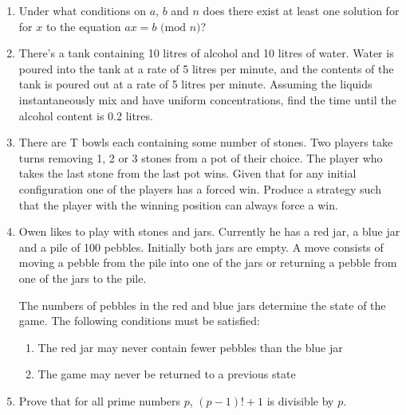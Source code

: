 \documentclass{article}
\begin{document}
\begin{enumerate}
    \item
    Under what conditions on $a$, $b$ and $n$ does there exist at least one solution for for $x$ to the equation $ax = b \text{ (mod } n\text{)}$?
    
    \item
    There's a tank containing 10 litres of alcohol and 10 litres of water. Water is poured into the tank at a rate of 5 litres per minute, and the contents of the tank is poured out at a rate of 5 litres per minute. Assuming the liquids instantaneously mix and have uniform concentrations, find the time until the alcohol content is 0.2 litres.
    
    \item
    There are T bowls each containing some number of stones. Two players take turns removing 1, 2 or 3 stones from a pot of their choice. The player who takes the last stone from the last pot wins. Given that for any initial configuration one of the players has a forced win. Produce a strategy such that the player with the winning position can always force a win.
    
    \item
    Owen likes to play with stones and jars. Currently he has a red jar, a blue jar and a pile of 100 pebbles. Initially both jars are empty. A move consists of moving a pebble from the pile into one of the jars or returning a pebble from one of the jars to the pile.
    
    The numbers of pebbles in the red and blue jars determine the state of the game. The following conditions must be satisfied:
    
    \begin{enumerate}
        \item The red jar may never contain fewer pebbles than the blue jar
        \item The game may never be returned to a previous state
    \end{enumerate}
    
    \item
    Prove that for all prime numbers $p$, $(p-1)! + 1$ is divisible by $p$.
    
    
    
    
    
    
\end{enumerate}
\end{document}
